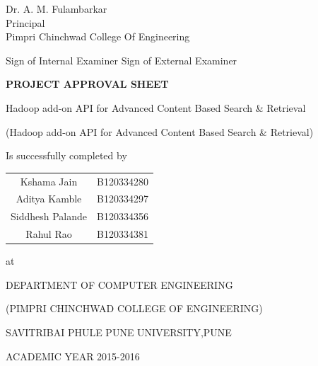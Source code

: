 \documentclass[oneside,a4paper,12pt]{report}
\begin{document}
\begin{center}
	{
		Dr. A. M. Fulambarkar \\
		Principal\\
		Pimpri Chinchwad College Of Engineering  
	}
\end{center}


Sign of Internal Examiner 
\hspace{40 mm} Sign of External Examiner


\newpage
\begin{center}
	\textbf{PROJECT APPROVAL SHEET}
\end{center}
\begin{center}
Hadoop add-on API for Advanced Content Based Search \& Retrieval
\end{center}

\begin{center}
(Hadoop add-on API for Advanced Content Based Search \& Retrieval)
\end{center}

\begin{center}
Is successfully completed by 
\end{center}

\begin{center}
\begin{tabular}{cc}
	Kshama Jain  & B120334280 \\
	Aditya Kamble  & B120334297 \\
	Siddhesh Palande  & B120334356 \\
	Rahul Rao  & B120334381 \\[4ex]
\end{tabular}
\end{center}

\begin{center}
	at
\end{center} 
\begin{center}
	DEPARTMENT OF COMPUTER ENGINEERING
\end{center}
\begin{center}
	(PIMPRI CHINCHWAD COLLEGE OF ENGINEERING)
\end{center}
\begin{center}
	SAVITRIBAI PHULE PUNE UNIVERSITY,PUNE
\end{center}

\begin{center}
	ACADEMIC YEAR 2015-2016
\end{center}
\end{document}
